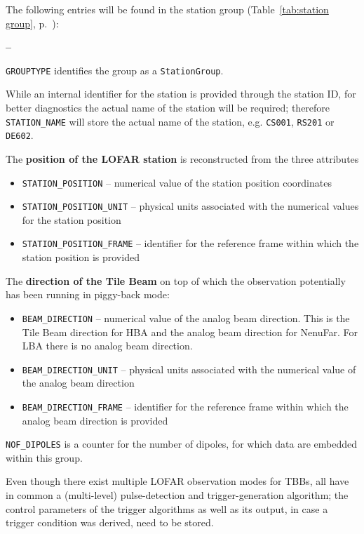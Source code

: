 \documentclass[a4paper,10pt,bibtotoc]{scrartcl}
\begin{document}
The following entries will be found in the station group (Table~\ref{tab:station group}, p.~\pageref{tab:station group}):
\begin{list}{\textbf{--}}{}
\item \verb|GROUPTYPE| identifies the group as a \verb|StationGroup|.
\item While an internal identifier for the station is provided
  through the station ID, for better diagnostics the actual name of
  the station will be required; therefore \verb|STATION_NAME| will
  store the actual name of the station, e.g. \texttt{CS001},
  \texttt{RS201} or \texttt{DE602}.
\item The \textbf{position of the LOFAR station} is reconstructed from the three
  attributes
  \begin{itemize} \parskip 0pt
  \item \verb|STATION_POSITION| -- numerical value of the station position
    coordinates
  \item \verb|STATION_POSITION_UNIT| -- physical units associated with the numerical
    values for the station position
  \item \verb|STATION_POSITION_FRAME| -- identifier for the reference frame within
    which the station position is provided
  \end{itemize}
\item The \textbf{direction of the Tile Beam} on top of which the observation
  potentially has been running in piggy-back mode:
  \begin{itemize} \parskip 0pt
  \item \verb|BEAM_DIRECTION| -- numerical value of the analog beam direction. This is the Tile Beam direction for HBA and the analog beam direction for NenuFar. For LBA there is no analog beam direction.
  \item \verb|BEAM_DIRECTION_UNIT| -- physical units associated with the numerical
    value of the analog beam direction
  \item \verb|BEAM_DIRECTION_FRAME| -- identifier for the reference frame within
    which the analog beam direction is provided
  \end{itemize}
\item \verb|NOF_DIPOLES| is a counter for the number of dipoles, for which data
  are embedded within this group.
\end{list}

Even though there exist multiple LOFAR observation modes for TBBs, all
have in common a (multi-level) pulse-detection and trigger-generation algorithm;
the control parameters of the trigger algorithms as well as its output, in case
a trigger condition was derived, need to be stored.
\end{document}
